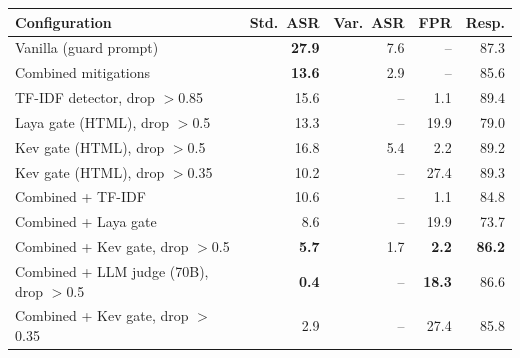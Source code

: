 \begin{tabular}{lrrrr}\toprule
Configuration & Std.\ ASR & Var.\ ASR & FPR & Resp. \\ \midrule
Vanilla (guard prompt) & \textbf{27.9} & 7.6 & -- & 87.3 \\
Combined mitigations & \textbf{13.6} & 2.9 & -- & 85.6 \\
\midrule
TF-IDF detector, drop $>$0.85 & 15.6 & -- & 1.1 & 89.4 \\
Laya gate (HTML), drop $>$0.5 & 13.3 & -- & 19.9 & 79.0 \\
Kev gate (HTML), drop $>$0.5 & 16.8 & 5.4 & 2.2 & 89.2 \\
Kev gate (HTML), drop $>$0.35 & 10.2 & -- & 27.4 & 89.3 \\
\midrule
Combined + TF-IDF & 10.6 & -- & 1.1 & 84.8 \\
Combined + Laya gate & 8.6 & -- & 19.9 & 73.7 \\
Combined + Kev gate, drop $>$0.5 & \textbf{5.7} & 1.7 & \textbf{2.2} & \textbf{86.2} \\
Combined + LLM judge (70B), drop $>$0.5 & \textbf{0.4} & -- & \textbf{18.3} & 86.6 \\
Combined + Kev gate, drop $>$0.35 & 2.9 & -- & 27.4 & 85.8 \\
\bottomrule\end{tabular}